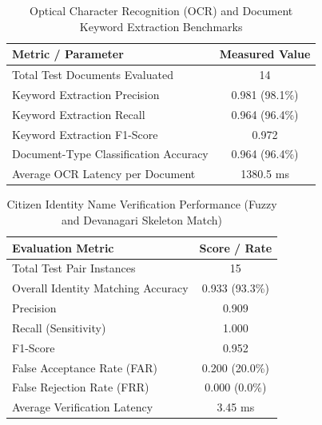 
\begin{table}[htbp]
\centering
\caption{Optical Character Recognition (OCR) and Document Keyword Extraction Benchmarks}
\label{tab:ocr_evaluation}
\begin{tabular}{lc}
\toprule
\textbf{Metric / Parameter} & \textbf{Measured Value} \\
\midrule
Total Test Documents Evaluated & 14 \\
Keyword Extraction Precision & 0.981 (98.1\%) \\
Keyword Extraction Recall & 0.964 (96.4\%) \\
Keyword Extraction F1-Score & 0.972 \\
Document-Type Classification Accuracy & 0.964 (96.4\%) \\
Average OCR Latency per Document & 1380.5 ms \\
\bottomrule
\end{tabular}
\end{table}

\vspace{1em}

\begin{table}[htbp]
\centering
\caption{Citizen Identity Name Verification Performance (Fuzzy and Devanagari Skeleton Match)}
\label{tab:name_verification_evaluation}
\begin{tabular}{lc}
\toprule
\textbf{Evaluation Metric} & \textbf{Score / Rate} \\
\midrule
Total Test Pair Instances & 15 \\
Overall Identity Matching Accuracy & 0.933 (93.3\%) \\
Precision & 0.909 \\
Recall (Sensitivity) & 1.000 \\
F1-Score & 0.952 \\
False Acceptance Rate (FAR) & 0.200 (20.0\%) \\
False Rejection Rate (FRR) & 0.000 (0.0\%) \\
Average Verification Latency & 3.45 ms \\
\bottomrule
\end{tabular}
\end{table}


